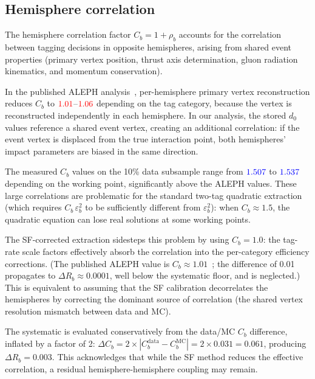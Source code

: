 \documentclass[11pt,a4paper]{article}
\newcommand{\measured}[1]{\textcolor{blue}{#1}}
\newcommand{\external}[1]{\textcolor{red}{#1}}
\begin{document}
\subsection{Hemisphere correlation}
\label{sec:syst-Cb}

The hemisphere correlation factor $C_b = 1 + \rho_b$ accounts for
the correlation between tagging decisions in opposite hemispheres,
arising from shared event properties (primary vertex position,
thrust axis determination, gluon radiation kinematics, and
momentum conservation).

In the published ALEPH analysis~\cite{ALEPH:Rb:1996}, per-hemisphere
primary vertex reconstruction reduces $C_b$ to
$\external{1.01}$--$\external{1.06}$ depending on the tag category,
because the vertex is reconstructed independently in each hemisphere.
In our analysis, the stored $d_0$ values reference a shared event
vertex, creating an additional correlation: if the event vertex is
displaced from the true interaction point, both hemispheres'
impact parameters are biased in the same direction.

The measured $C_b$ values on the 10\% data subsample range from
$\measured{1.507}$ to $\measured{1.537}$ depending on the
working point, significantly above the ALEPH values.
These large correlations are problematic for the standard
two-tag quadratic extraction (which requires
$C_b\,\varepsilon_b^2$ to be sufficiently different from
$\varepsilon_b^2$): when $C_b \approx 1.5$, the quadratic
equation can lose real solutions at some working points.

The SF-corrected extraction sidesteps this problem by using
$C_b = 1.0$: the tag-rate scale factors effectively absorb
the correlation into the per-category efficiency corrections.
(The published ALEPH value is $C_b \approx 1.01$~\cite{ALEPH:Rb:1996};
the difference of 0.01 propagates to $\Delta R_b \approx 0.0001$,
well below the systematic floor, and is neglected.)
This is equivalent to assuming that the SF calibration
decorrelates the hemispheres by correcting the dominant source
of correlation (the shared vertex resolution mismatch between
data and MC).

The systematic is evaluated conservatively from the data/MC
$C_b$ difference, inflated by a factor of 2:
$\Delta C_b = 2 \times |C_b^\text{data} - C_b^\text{MC}|
= 2 \times 0.031 = 0.061$, producing $\Delta R_b = 0.003$.
This acknowledges that while the SF method reduces the effective
correlation, a residual hemisphere-hemisphere coupling may remain.
\end{document}
